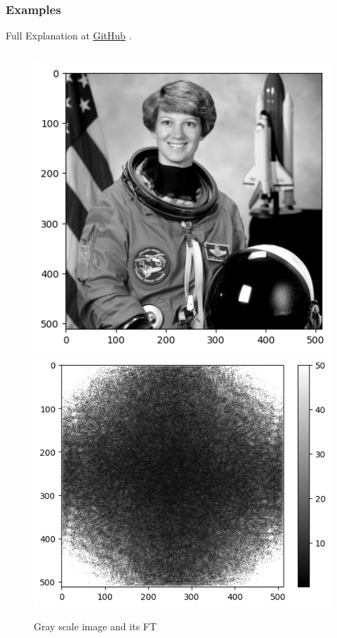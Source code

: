\documentclass{beamer}
\newcommand{\github}{
\href{https://github.com/A-M-Kharazi/Machine-Learning-TMU}{GitHub}
}
\begin{document}
		\begin{frame}
		\frametitle{Examples}
		
		Full Explanation at \github.
		
		\begin{columns}
			\begin{column}{0.4\textwidth}
				\begin{figure}\label{fig4}
					\begin{center}
						\includegraphics[scale=0.22]{fig3.png}
						\includegraphics[scale=0.22]{fig4.png}
					\end{center}
				\caption{Gray scale image and its FT}
				\end{figure}
			\end{column}
			

\end{columns}
\end{frame}
\end{document}
